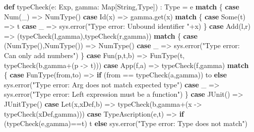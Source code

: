 \documentclass[]{article}
\newenvironment{Shaded}{}{}
\newcommand{\FunctionTok}[1]{\textcolor[rgb]{0.02,0.16,0.49}{#1}}
\newcommand{\KeywordTok}[1]{\textcolor[rgb]{0.00,0.44,0.13}{\textbf{#1}}}
\newcommand{\NormalTok}[1]{#1}
\newcommand{\StringTok}[1]{\textcolor[rgb]{0.25,0.44,0.63}{#1}}
\begin{document}
\begin{Shaded}
\begin{Highlighting}[]
\KeywordTok{def} \FunctionTok{typeCheck}\NormalTok{(e: Exp, gamma: Map[String,Type]) : Type = e }\KeywordTok{match}\NormalTok{ \{}
  \KeywordTok{case} \FunctionTok{Num}\NormalTok{(\_) =\textgreater{} }\FunctionTok{NumType}\NormalTok{()}
  \KeywordTok{case} \FunctionTok{Id}\NormalTok{(x) =\textgreater{} gamma.}\FunctionTok{get}\NormalTok{(x) }\KeywordTok{match}\NormalTok{ \{}
    \KeywordTok{case}\NormalTok{ Some(t) =\textgreater{} t}
    \KeywordTok{case}\NormalTok{ \_ =\textgreater{} sys.}\FunctionTok{error}\NormalTok{(}\StringTok{"Type error: Unbound identifier "}\NormalTok{+x)}
\NormalTok{  \}}
  \KeywordTok{case} \FunctionTok{Add}\NormalTok{(l,r) =\textgreater{} (}\FunctionTok{typeCheck}\NormalTok{(l,gamma),}\FunctionTok{typeCheck}\NormalTok{(r,gamma)) }\KeywordTok{match}\NormalTok{ \{}
    \KeywordTok{case}\NormalTok{ (}\FunctionTok{NumType}\NormalTok{(),}\FunctionTok{NumType}\NormalTok{()) =\textgreater{} }\FunctionTok{NumType}\NormalTok{()}
    \KeywordTok{case}\NormalTok{ \_ =\textgreater{} sys.}\FunctionTok{error}\NormalTok{(}\StringTok{"Type error: Can only add numbers"}\NormalTok{)}
\NormalTok{  \}}
  \KeywordTok{case} \FunctionTok{Fun}\NormalTok{(p,t,b) =\textgreater{} }\FunctionTok{FunType}\NormalTok{(t, }\FunctionTok{typeCheck}\NormalTok{(b,gamma+(p {-}\textgreater{} t)))}
  \KeywordTok{case} \FunctionTok{App}\NormalTok{(f,a) =\textgreater{} }\FunctionTok{typeCheck}\NormalTok{(f,gamma) }\KeywordTok{match}\NormalTok{ \{}
    \KeywordTok{case} \FunctionTok{FunType}\NormalTok{(from,to) =\textgreater{}}
      \KeywordTok{if}\NormalTok{ (from == }\FunctionTok{typeCheck}\NormalTok{(a,gamma)) to}
      \KeywordTok{else}\NormalTok{ sys.}\FunctionTok{error}\NormalTok{(}\StringTok{"Type error: Arg does not match expected type"}\NormalTok{)}
    \KeywordTok{case}\NormalTok{ \_ =\textgreater{} sys.}\FunctionTok{error}\NormalTok{(}\StringTok{"Type error: Left expression must be a function"}\NormalTok{)}
\NormalTok{  \}}
  \KeywordTok{case} \FunctionTok{JUnit}\NormalTok{() =\textgreater{} }\FunctionTok{JUnitType}\NormalTok{()}
  \KeywordTok{case} \FunctionTok{Let}\NormalTok{(x,xDef,b) =\textgreater{} }\FunctionTok{typeCheck}\NormalTok{(b,gamma+(x {-}\textgreater{} }\FunctionTok{typeCheck}\NormalTok{(xDef,gamma)))}
  \KeywordTok{case} \FunctionTok{TypeAscription}\NormalTok{(e,t) =\textgreater{}}
    \KeywordTok{if}\NormalTok{ (}\FunctionTok{typeCheck}\NormalTok{(e,gamma)==t) t}
    \KeywordTok{else}\NormalTok{ sys.}\FunctionTok{error}\NormalTok{(}\StringTok{"Type error: Type does not match"}\NormalTok{)}

\end{Highlighting}
\end{Shaded}
\end{document}
